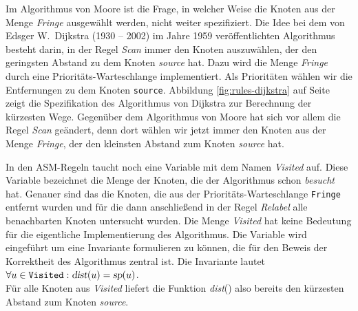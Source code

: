 \noindent
Im Algorithmus von Moore ist die Frage, in welcher Weise die Knoten aus der Menge
\textsl{Fringe} ausgew\"ahlt werden, nicht weiter spezifiziert.  
Die Idee bei dem  von Edsger W.~Dijkstra (1930 -- 2002) im Jahre 1959 ver\"offentlichten
Algorithmus \cite{dijkstra:59}
besteht darin, in der Regel \textsl{Scan} immer den Knoten auszuw\"ahlen, der den geringsten Abstand zu
dem Knoten \textsl{source} hat.
Dazu wird die Menge \textsl{Fringe} durch eine Priorit\"ats-Warteschlange
implementiert.  Als Priorit\"aten w\"ahlen wir die Entfernungen zu dem Knoten \texttt{source}.
Abbildung \ref{fig:rules-dijkstra} auf Seite \pageref{fig:rules-dijkstra} zeigt die 
Spezifikation des Algorithmus von Dijkstra zur Berechnung der k\"urzesten Wege.
Gegen\"uber dem Algorithmus von Moore hat sich vor allem die Regel \textsl{Scan} ge\"andert,
denn dort w\"ahlen wir jetzt immer den Knoten aus der Menge \textsl{Fringe}, der den
kleinsten Abstand zum Knoten \textsl{source} hat.

In den ASM-Regeln taucht noch eine Variable mit dem Namen \textsl{Visited} auf.
Diese Variable bezeichnet die Menge der Knoten, die der Algorithmus schon \textsl{besucht}
hat.  Genauer sind das die Knoten, die aus der Priorit\"ats-Warteschlange \texttt{Fringe}
entfernt wurden und f\"ur die dann anschlie{\ss}end in der Regel \textsl{Relabel} alle
benachbarten Knoten untersucht wurden.  Die Menge \textsl{Visited} hat keine Bedeutung f\"ur
die eigentliche Implementierung des Algorithmus.  Die Variable wird eingef\"uhrt um eine Invariante formulieren
zu k\"onnen, die f\"ur den Beweis der Korrektheit des Algorithmus zentral ist.  Die Invariante lautet
\\[0.2cm]
\hspace*{1.3cm}
$\forall u\in\mathtt{Visited}: \textsl{dist}(u) = \textsl{sp}(u)$.
\\[0.2cm]
F\"ur alle Knoten aus \textsl{Visited} liefert die Funktion \textsl{dist}() also bereits den
k\"urzesten Abstand zum Knoten \textsl{source}.  
\vspace*{0.1cm}

